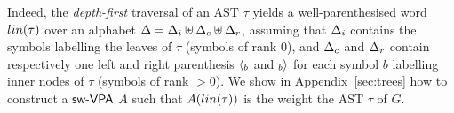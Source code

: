 %
Indeed, the \emph{depth-first} traversal of an AST $\tau$
yields a well-parenthesised word $\lin(\tau)$ over an alphabet
$\Delta = \Deltai \uplus \Deltac \uplus \Deltar$,
assuming \eg that $\Deltai$ contains the symbols labelling the leaves of $\tau$ (symbols of rank $0$),
and $\Deltac$ and $\Deltar$ contain respectively one left and right parenthesis
$\langle_{b}$ and $_{b}{\rangle}$ for each symbol $b$ labelling inner nodes of $\tau$ (symbols of rank $>0$).
%
%
We show in Appendix~\ref{sec:trees} how to construct
a $\textsf{sw-VPA}$ $A$ such that $A(\lin(\tau))$ is the weight the AST $\tau$ of $G$.

%
%
%
%
%
%


%


